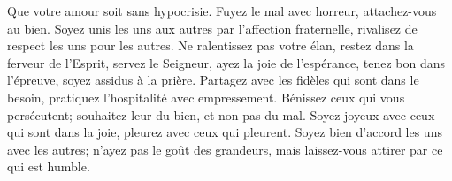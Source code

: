 Que votre amour soit sans hypocrisie.
	Fuyez le mal avec horreur, attachez-vous au bien.
Soyez unis les uns aux autres par l’affection fraternelle,
	rivalisez de respect les uns pour les autres.
Ne ralentissez pas votre élan, restez dans la ferveur de l’Esprit,
	servez le Seigneur, ayez la joie de l’espérance,
	tenez bon dans l’épreuve, soyez assidus à la prière.
Partagez avec les fidèles qui sont dans le besoin,
	pratiquez l’hospitalité avec empressement.
Bénissez ceux qui vous persécutent;
	souhaitez-leur du bien, et non pas du mal.
Soyez joyeux avec ceux qui sont dans la joie,
	pleurez avec ceux qui pleurent.
Soyez bien d’accord les uns avec les autres;
	n’ayez pas le goût des grandeurs,
		mais laissez-vous attirer par ce qui est humble.
